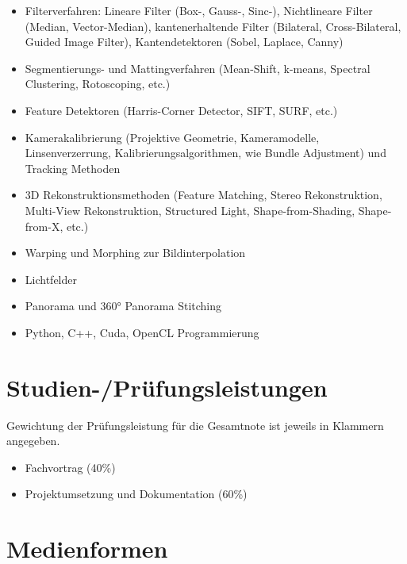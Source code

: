 \begin{itemize}
\tightlist
\item
  Filterverfahren: Lineare Filter (Box-, Gauss-, Sinc-), Nichtlineare
  Filter (Median, Vector-Median), kantenerhaltende Filter (Bilateral,
  Cross-Bilateral, Guided Image Filter), Kantendetektoren (Sobel,
  Laplace, Canny)
\item
  Segmentierungs- und Mattingverfahren (Mean-Shift, k-means, Spectral
  Clustering, Rotoscoping, etc.)
\item
  Feature Detektoren (Harris-Corner Detector, SIFT, SURF, etc.)
\item
  Kamerakalibrierung (Projektive Geometrie, Kameramodelle,
  Linsenverzerrung, Kalibrierungsalgorithmen, wie Bundle Adjustment) und
  Tracking Methoden
\item
  3D Rekonstruktionsmethoden (Feature Matching, Stereo Rekonstruktion,
  Multi-View Rekonstruktion, Structured Light, Shape-from-Shading,
  Shape-from-X, etc.)
\item
  Warping und Morphing zur Bildinterpolation
\item
  Lichtfelder
\item
  Panorama und 360° Panorama Stitching
\item
  Python, C++, Cuda, OpenCL Programmierung
\end{itemize}

\section*{Studien-/Prüfungsleistungen\label{/mi-2017/modulbeschreibungen-master/MA_VC_Modul_BildbasierteComputergrafik}}\label{studien-pruxfcfungsleistungenpathlabelmi-2017modulbeschreibungen-mastermaux5fvcux5fmodulux5fbildbasiertecomputergrafik}

Gewichtung der Prüfungsleistung für die Gesamtnote ist jeweils in
Klammern angegeben.

\begin{itemize}
\tightlist
\item
  Fachvortrag (40\%)
\item
  Projektumsetzung und Dokumentation (60\%)
\end{itemize}

\section*{Medienformen\label{/mi-2017/modulbeschreibungen-master/MA_VC_Modul_BildbasierteComputergrafik}}\label{medienformenpathlabelmi-2017modulbeschreibungen-mastermaux5fvcux5fmodulux5fbildbasiertecomputergrafik}


